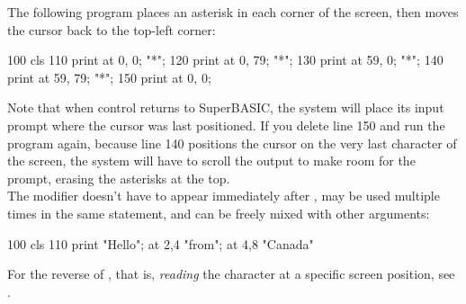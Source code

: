 \begin{entry}
{
} %

The following program places an asterisk in each corner of the screen, then moves the cursor back to the top-left corner:

\begin{lstexample}
100 cls
110 print at 0, 0; "*";
120 print at 0, 79; "*";
130 print at 59, 0; "*";
140 print at 59, 79; "*";
150 print at 0, 0;
\end{lstexample}

Note that when control returns to SuperBASIC, the system will place its input prompt where the cursor was last positioned. If you delete line 150 and run the program again, because line 140 positions the cursor on the very last character of the screen, the system will have to scroll the output to make room for the prompt, erasing the asterisks at the top.\\

The  modifier doesn't have to appear immediately after , may be used multiple times in the same statement, and can be freely mixed with other arguments:

\begin{lstexample}
100 cls 
110 print "Hello"; at 2,4 "from"; at 4,8 "Canada"
\end{lstexample}

For the reverse of , that is, \emph{reading} the character at a specific screen position, see .

\end{entry}

